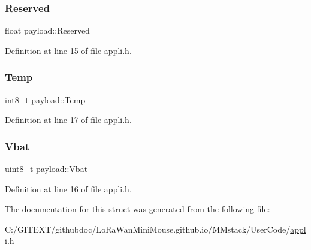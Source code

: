 \subsubsection{\texorpdfstring{Reserved}{Reserved}}
{\footnotesize\ttfamily float payload\+::\+Reserved}



Definition at line 15 of file appli.\+h.

\mbox{\label{structpayload_a37cc36f378c70d3fd1aa1116588e380b}} 
\subsubsection{\texorpdfstring{Temp}{Temp}}
{\footnotesize\ttfamily int8\+\_\+t payload\+::\+Temp}



Definition at line 17 of file appli.\+h.

\mbox{\label{structpayload_ada67d46f7c72f987d622511d30baeb11}} 
\subsubsection{\texorpdfstring{Vbat}{Vbat}}
{\footnotesize\ttfamily uint8\+\_\+t payload\+::\+Vbat}



Definition at line 16 of file appli.\+h.



The documentation for this struct was generated from the following file\+:\begin{DoxyCompactItemize}
\item 
C\+:/\+G\+I\+T\+E\+X\+T/githubdoc/\+Lo\+Ra\+Wan\+Mini\+Mouse.\+github.\+io/\+M\+Mstack/\+User\+Code/\mbox{\hyperlink{appli_8h}{appli.\+h}}\end{DoxyCompactItemize}
